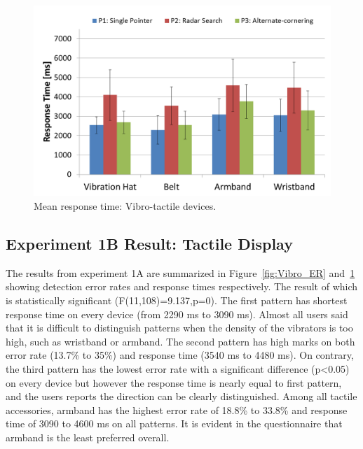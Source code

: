 \documentclass{sigchi}
\begin{document}
\begin{figure}[!t]
\centering
\includegraphics[width=\columnwidth]{Vibro_RT}
\caption{Mean response time: Vibro-tactile devices.}
\label{fig:Vibro_RT}
\end{figure}

\subsection{Experiment 1B Result: Tactile Display}
The results from experiment 1A are summarized in Figure~\ref{fig:Vibro_ER} and~\ref{fig:Vibro_RT} showing detection error rates and response times respectively. The result of which is statistically significant (F(11,108)=9.137,p=0). The first pattern has shortest response time on every device (from 2290 ms to 3090 ms). Almost all users said that it is difficult to distinguish patterns when the density of the vibrators is too high, such as wristband or armband. The second pattern has high marks on both error rate (13.7\% to 35\%) and response time (3540 ms to 4480 ms). On contrary, the third pattern has the lowest error rate with a significant difference (p\textless0.05) on every device but however the response time is nearly equal to first pattern, and the users reports the direction can be clearly distinguished. Among all tactile accessories, armband has the highest error rate of 18.8\% to 33.8\% and response time of 3090 to 4600 ms on all patterns. It is evident in the questionnaire that armband is the least preferred overall.
\end{document}
